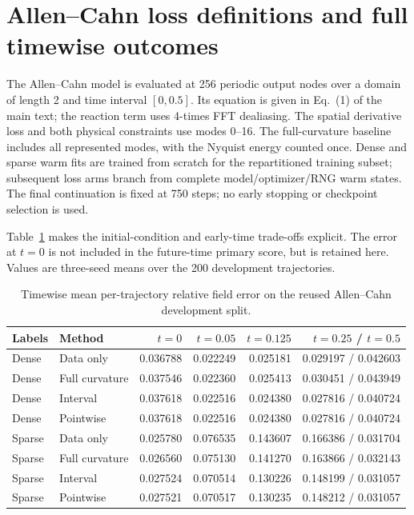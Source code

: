 \documentclass[10pt,a4paper]{article}
\begin{document}
\section{Allen--Cahn loss definitions and full timewise outcomes}
The Allen--Cahn model is evaluated at 256 periodic output nodes over a domain of length 2 and time interval $[0,0.5]$. Its equation is given in Eq.~(1) of the main text; the reaction term uses 4-times FFT dealiasing. The spatial derivative loss and both physical constraints use modes 0--16. The full-curvature baseline includes all represented modes, with the Nyquist energy counted once. Dense and sparse warm fits are trained from scratch for the repartitioned training subset; subsequent loss arms branch from complete model/optimizer/RNG warm states. The final continuation is fixed at 750 steps; no early stopping or checkpoint selection is used.

Table~\ref{tab:timewise} makes the initial-condition and early-time trade-offs explicit. The error at $t=0$ is not included in the future-time primary score, but is retained here. Values are three-seed means over the 200 development trajectories.

\begin{table}[H]
\centering\scriptsize
\caption{Timewise mean per-trajectory relative field error on the reused Allen--Cahn development split.}
\label{tab:timewise}
\begin{tabular}{llrrrr}
\toprule
Labels & Method & $t=0$ & $t=0.05$ & $t=0.125$ & $t=0.25$ / $t=0.5$ \\
\midrule
Dense & Data only & 0.036788 & 0.022249 & 0.025181 & 0.029197 / 0.042603 \\
Dense & Full curvature & 0.037546 & 0.022360 & 0.025413 & 0.030451 / 0.043949 \\
Dense & Interval & 0.037618 & 0.022516 & 0.024380 & 0.027816 / 0.040724 \\
Dense & Pointwise & 0.037618 & 0.022516 & 0.024380 & 0.027816 / 0.040724 \\
\midrule
Sparse & Data only & 0.025780 & 0.076535 & 0.143607 & 0.166386 / 0.031704 \\
Sparse & Full curvature & 0.026560 & 0.075130 & 0.141270 & 0.163866 / 0.032143 \\
Sparse & Interval & 0.027524 & 0.070514 & 0.130226 & 0.148199 / 0.031057 \\
Sparse & Pointwise & 0.027521 & 0.070517 & 0.130235 & 0.148212 / 0.031057 \\
\bottomrule
\end{tabular}
\end{table}
\end{document}
